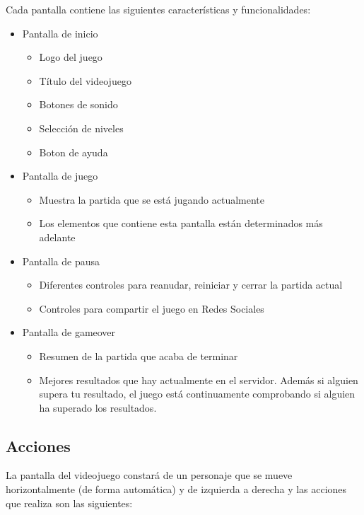 \documentclass[palatino]{apuntes}
\begin{document}
Cada pantalla contiene las siguientes características y funcionalidades:
\begin{itemize}
    \item Pantalla de inicio
        \begin{itemize}
            \item Logo del juego
            \item Título del videojuego
            \item Botones de sonido
            \item Selección de niveles
            \item Boton de ayuda
        \end{itemize}
   
    \item Pantalla de juego
        \begin{itemize}
            \item Muestra la partida que se está jugando actualmente
            \item Los elementos que contiene esta pantalla están determinados más adelante
        \end{itemize}
   
    \item Pantalla de pausa
        \begin{itemize}
            \item Diferentes controles para reanudar, reiniciar y cerrar la partida actual
            \item Controles para compartir el juego en Redes Sociales
        \end{itemize}
   
    \item Pantalla de gameover
        \begin{itemize}
            \item Resumen de la partida que acaba de terminar
            \item Mejores resultados que hay actualmente en el servidor. Además si alguien supera tu resultado, el juego está continuamente comprobando si alguien ha superado los resultados.
        \end{itemize}
    
\end{itemize}


\subsection{Acciones}
La pantalla del videojuego constará de un personaje que se mueve horizontalmente (de forma automática) y de izquierda a derecha y las acciones que  realiza son las siguientes:
\end{document}
